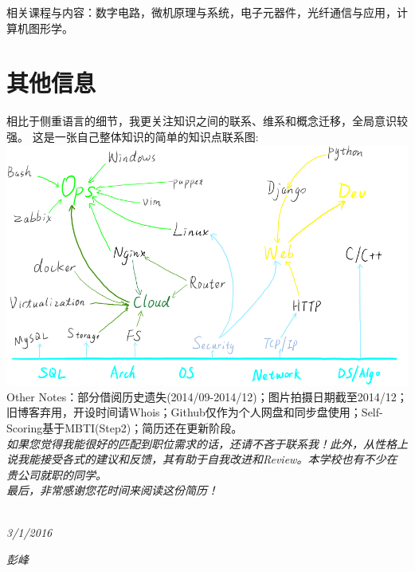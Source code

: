\documentclass[]{friggeri-cv}
\begin{document}
相关课程与内容：数字电路，微机原理与系统，电子元器件，光纤通信与应用，计算机图形学。\\


\section{其他信息}
相比于侧重语言的细节，我更关注知识之间的联系、维系和概念迁移，全局意识较强。
这是一张自己整体知识的简单的知识点联系图:\\
\includegraphics[scale=0.60]{img/devopsgraph.png}
Other Notes：部分借阅历史遗失(2014/09-2014/12)；图片拍摄日期截至2014/12；旧博客弃用，开设时间请Whois；Github仅作为个人网盘和同步盘使用；Self-Scoring\hspace{1mm}基于MBTI(Step2)；简历还在更新阶段。\\

\emph{如果您觉得我能很好的匹配到职位需求的话，还请不吝于联系我！此外，从性格上说我能接受各式的建议和反馈，其有助于自我改进和Review。本学校也有不少在贵公司就职的同学。\\
最后，非常感谢您花时间来阅读这份简历！\\}
~
\begin{flushleft}
\emph{3/1/2016}
\end{flushleft}
\begin{flushright}
\emph{彭峰}
\end{flushright}
\end{document}
